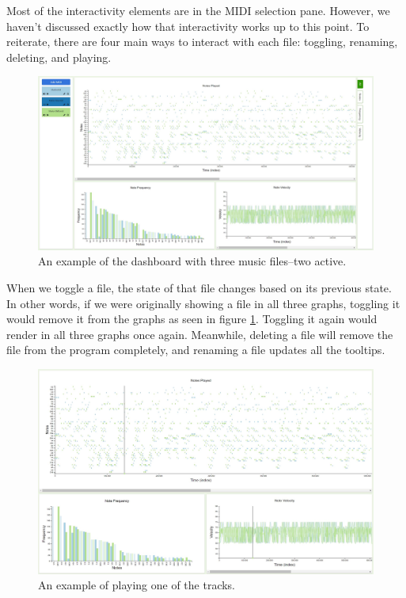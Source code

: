 \documentclass[journal]{vgtc}                %
\begin{document}
Most of the interactivity elements are in the MIDI selection pane. However, we
haven't discussed exactly how that interactivity works up to this point. To
reiterate, there are four main ways to interact with each file: toggling,
renaming, deleting, and playing.

\begin{figure}[h]
  \centering
  \includegraphics[width=\columnwidth]{dashboard-multi-track}
  \caption{An example of the dashboard with three music files--two active.}
  \label{fig:dashboard-multi}
\end{figure}

When we toggle a file, the state of that file changes based on its previous
state. In other words, if we were originally showing a file in all three graphs,
toggling it would remove it from the graphs as seen in figure
\ref{fig:dashboard-multi}. Toggling it again would render in all three graphs
once again. Meanwhile, deleting a file will remove the file from the program
completely, and renaming a file updates all the tooltips.

\begin{figure}[h]
  \centering
  \includegraphics[width=\columnwidth]{play-multi-track}
  \caption{An example of playing one of the tracks.}
  \label{fig:play}
\end{figure}
\end{document}
